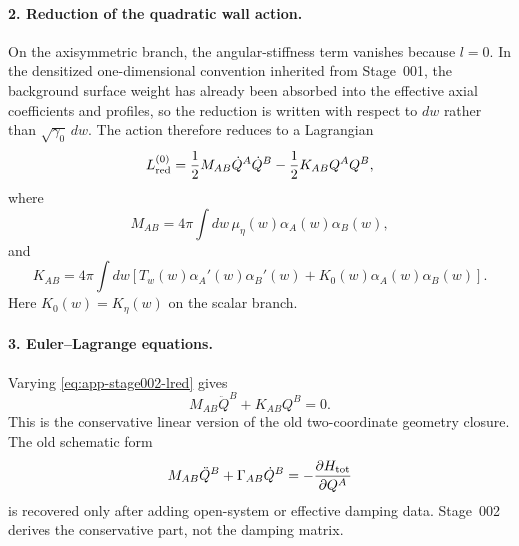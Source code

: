 \paragraph{2. Reduction of the quadratic wall action.}
On the axisymmetric branch, the angular-stiffness term vanishes because \(l=0\).  In the densitized one-dimensional convention inherited from Stage~001, the background surface weight has already been absorbed into the effective axial coefficients and profiles, so the reduction is written with respect to \(dw\) rather than \(\sqrt{\gamma_0}\,dw\).  The action therefore reduces to a Lagrangian
\begin{equation}
\label{eq:app-stage002-lred}
L_{\rm red}^{(0)}
=\frac12 M_{AB}\dot Q^A\dot Q^B
-\frac12 K_{AB}Q^AQ^B,
\end{equation}
where
\begin{equation}
\label{eq:app-stage002-mass-matrix}
\boxed{
M_{AB}=4\pi\int dw\,\mu_\eta(w)\alpha_A(w)\alpha_B(w)},
\end{equation}
and
\begin{equation}
\label{eq:app-stage002-stiffness-matrix}
\boxed{
K_{AB}=4\pi\int dw\left[
T_w(w)\alpha_A'(w)\alpha_B'(w)+K_0(w)\alpha_A(w)\alpha_B(w)
\right]}.
\end{equation}
Here \(K_0(w)=K_\eta(w)\) on the scalar branch.

\paragraph{3. Euler--Lagrange equations.}
Varying \eqref{eq:app-stage002-lred} gives
\begin{equation}
\label{eq:app-stage002-el}
\boxed{
M_{AB}\ddot Q^B+K_{AB}Q^B=0}.
\end{equation}
This is the conservative linear version of the old two-coordinate geometry closure.  The old schematic form
\begin{equation}
M_{AB}\ddot Q^B+\Gamma_{AB}\dot Q^B=-\frac{\partial H_{\rm tot}}{\partial Q^A}
\end{equation}
is recovered only after adding open-system or effective damping data.  Stage~002 derives the conservative part, not the damping matrix.

